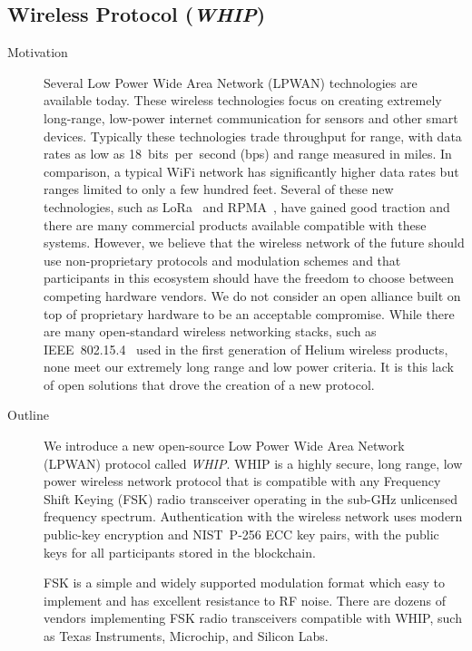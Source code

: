 \documentclass[10pt, nonatbib, nocopyrightspace, reprint]{sigplanconf}
\begin{document}
\subsection{Wireless Protocol (\emph{WHIP})}\label{whip}

\begin{description}
        \item [Motivation] Several Low Power Wide Area Network (LPWAN) technologies are available today. These wireless technologies focus on creating extremely long-range, low-power internet communication for sensors and other smart devices. Typically these technologies trade throughput for range, with data rates as low as 18~bits~per~second (bps) and range measured in miles. In comparison, a typical WiFi network has significantly higher data rates but ranges limited to only a few hundred feet. Several of these new technologies, such as LoRa~\cite{lora} and RPMA~\cite{rpma}, have gained good traction and there are many commercial products available compatible with these systems. However, we believe that the wireless network of the future should use non-proprietary protocols and modulation schemes and that participants in this ecosystem should have the freedom to choose between competing hardware vendors. We do not consider an open alliance built on top of proprietary hardware to be an acceptable compromise. While there are many open-standard wireless networking stacks, such as IEEE~802.15.4~\cite{ieee802_15_4} used in the first generation of Helium wireless products, none meet our extremely long range and low power criteria. It is this lack of open solutions that drove the creation of a new protocol.

        \item [Outline] We introduce a new open-source Low Power Wide Area Network (LPWAN) protocol called \emph{WHIP}. WHIP is a highly secure, long range, low power wireless network protocol that is compatible with any Frequency Shift Keying (FSK) radio transceiver operating in the sub-GHz unlicensed frequency spectrum. Authentication with the wireless network uses modern public-key encryption and NIST~P-256 ECC key pairs, with the public keys for all participants stored in the blockchain.

        FSK is a simple and widely supported modulation format which easy to implement and has excellent resistance to RF noise. There are dozens of vendors implementing FSK radio transceivers compatible with WHIP, such as Texas Instruments, Microchip, and Silicon Labs.


\end{description}
\end{document}
